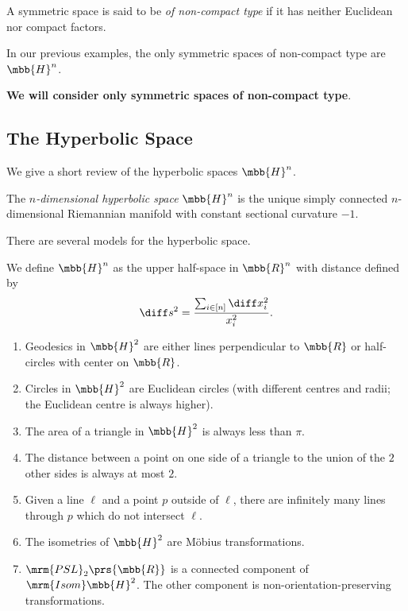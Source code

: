 \documentclass[10pt, twoside]{book}
\begin{document}
\begin{definition}
A symmetric space is said to be \emph{of non-compact type} if it has neither Euclidean nor compact factors. 
\end{definition}

\begin{example}
In our previous examples, the only symmetric spaces of non-compact type are $\mbb{H}^n$.
\end{example}

\begin{assumption}
\textbf{We will consider only symmetric spaces of non-compact type}.
\end{assumption}

\subsection{The Hyperbolic Space}

We give a short review of the hyperbolic spaces $\mbb{H}^n$.

\begin{definition}
The \emph{$n$-dimensional hyperbolic space} $\mbb{H}^n$ is the unique simply connected $n$-dimensional Riemannian manifold with constant sectional curvature $-1$.
\end{definition}

There are several models for the hyperbolic space.

\begin{definition}
We define $\mbb{H}^n$ as the upper half-space in $\mbb{R}^n$ with distance defined by
\[\diff s^2 = \frac{\sum_{i \in [n]} \diff x_i^2}{x_i^2} \text{.}\]
\end{definition}

\begin{proposition}
\begin{enumerate}
\item Geodesics in $\mbb{H}^2$ are either lines perpendicular to $\mbb{R}$ or half-circles with center on $\mbb{R}$.
\item Circles in $\mbb{H}^2$ are Euclidean circles (with different centres and radii; the Euclidean centre is always higher).
\item The area of a triangle in $\mbb{H}^2$ is always less than $\pi$.
\item The distance between a point on one side of a triangle to the union of the $2$ other sides is always at most $2$.
\item Given a line $\ell$ and a point $p$ outside of $\ell$, there are infinitely many lines through $p$ which do not intersect $\ell$.
\item The isometries of $\mbb{H}^2$ are Möbius transformations.
\item $\mrm{PSL}_2\prs{\mbb{R}}$ is a connected component of $\mrm{Isom}\mbb{H}^2$. The other component is non-orientation-preserving transformations.
\end{enumerate}
\end{proposition}
\end{document}
